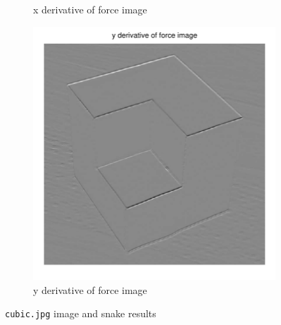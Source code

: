 \documentclass[11pt,a4paper]{article}
\begin{document}
\begin{figure}[H]
\begin{subfigure}[t]{0.48\textwidth}
        \caption{x derivative of force image}
        \label{fig:cubic_fx}
    \end{subfigure}
    \begin{subfigure}[t]{0.48\textwidth}
        \includegraphics[width=\textwidth]{src/images/cubic_yforces.pdf}
        \caption{y derivative of force image}
        \label{fig:cubic_fy}
    \end{subfigure}
    \caption{\texttt{cubic.jpg} image and snake results}
    \label{fig:cubic}
\end{figure}
\end{document}
